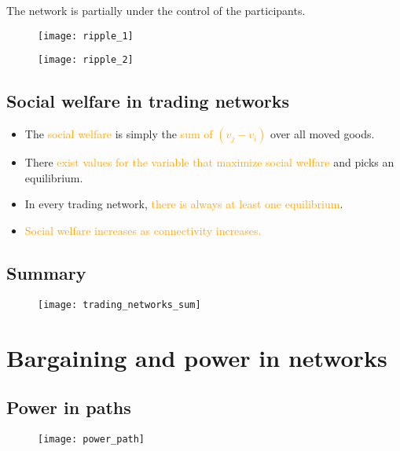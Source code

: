 The network is partially under the control of the participants.

\begin{figure}[H]
    \centering
    \texttt{[image: ripple\_1]}
\end{figure}

\begin{figure}[H]
    \centering
    \texttt{[image: ripple\_2]}
\end{figure}

\subsection{Social welfare in trading networks}

\begin{itemize}
\item The \textcolor{orange}{social welfare} is simply the \textcolor{orange}{sum of $(v_j - v_i)$} over all moved goods.
\item There \textcolor{orange}{exist values for the variable that maximize social welfare} and picks an equilibrium.
\item In every trading network, \textcolor{orange}{there is always at least one equilibrium}.
\item \textcolor{orange}{Social welfare increases as connectivity increases.}
\end{itemize}

\subsection{Summary}

\begin{figure}[H]
    \centering
    \texttt{[image: trading\_networks\_sum]}
\end{figure}

\section{Bargaining and power in networks}

\subsection{Power in paths}

\begin{figure}[H]
    \centering
    \texttt{[image: power\_path]}
\end{figure}

